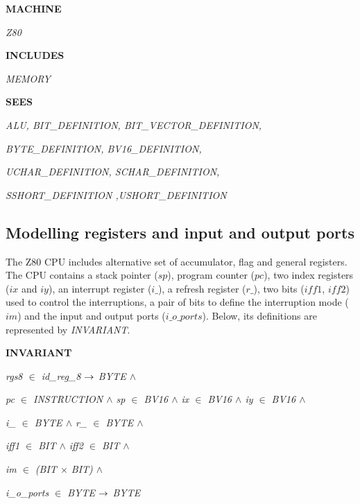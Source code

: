 \documentclass[11pt]{article} %
\begin{document}
\begin{sloppypar}

\bf MACHINE

\hspace*{0.15in}\it Z80

\bf INCLUDES

\hspace*{0.10in}\it MEMORY

\bf SEES

\hspace*{0.10in}\it ALU, \it BIT\_DEFINITION, \it BIT\_VECTOR\_DEFINITION,

\hspace*{0.10in}\it BYTE\_DEFINITION, \it BV16\_DEFINITION,

\hspace*{0.10in}\it UCHAR\_DEFINITION, \it SCHAR\_DEFINITION,

\hspace*{0.10in}\it SSHORT\_DEFINITION ,\it USHORT\_DEFINITION
\end{sloppypar}


\subsection{Modelling registers and input and output ports}

The Z80 CPU includes alternative set of accumulator, flag and general registers. The CPU contains a stack
pointer ($\mathit{sp}$), program counter ($\mathit{pc}$), two index registers ($\mathit{ix}$ and $\mathit{iy}$), an
interrupt register ($\mathit{i\_}$), a refresh register ($\mathit{r\_}$), two bits ($\mathit{iff1}$,
$\mathit{iff2}$) used to control the interruptions, a pair of bits to define the interruption mode ($\mathit{im}$)
and the input and output ports ($\mathit{i\_o\_ports}$). Below, its definitions are represented by
\textit{INVARIANT}.
  
\begin{sloppypar}
\bf INVARIANT

\hspace*{0.10in}\it rgs8  $\in$  \it id\_reg\_8  $\rightarrow$  \it BYTE  $\land$ 

\hspace*{0.10in}\it pc  $\in$  \it INSTRUCTION  $\land$  \it sp  $\in$  \it BV16  $\land$  \it ix  $\in$  \it BV16  $\land$  \it iy  $\in$  \it BV16  $\land$ 

\hspace*{0.10in}\it i\_  $\in$  \it BYTE  $\land$  \it r\_ $\in$  \it BYTE  $\land$  

\hspace*{0.10in}\it iff1  $\in$  \it BIT  $\land$ \hspace*{0.10in}\it iff2  $\in$  \it BIT  $\land$ 

\hspace*{0.10in}\it im $\in$ (\it BIT $\times$ \it BIT\rm )  $\land$ 

\hspace*{0.10in}\it i\_o\_ports  $\in$  \it BYTE  $\rightarrow$  \it BYTE
\end{sloppypar}
\end{document}
